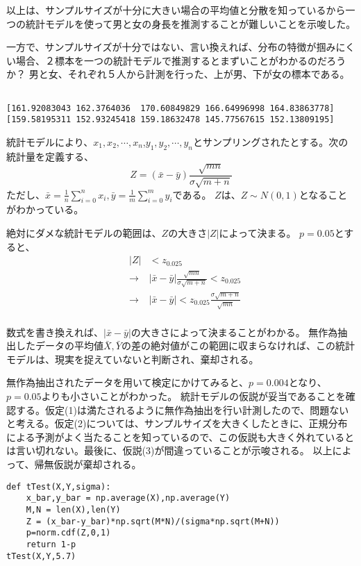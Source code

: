 \documentclass[a4paper,11pt,dvipdfmx]{jsarticle}
\begin{document}
以上は、サンプルサイズが十分に大きい場合の平均値と分散を知っているから一つの統計モデルを使って男と女の身長を推測することが難しいことを示唆した。


一方で、サンプルサイズが十分ではない、言い換えれば、分布の特徴が掴みにくい場合、２標本を一つの統計モデルで推測するとまずいことがわかるのだろうか？
男と女、それぞれ５人から計測を行った、上が男、下が女の標本である。
\begin{lstlisting}

[161.92083043 162.3764036  170.60849829 166.64996998 164.83863778]
[159.58195311 152.93245418 159.18632478 145.77567615 152.13809195]
\end{lstlisting}


統計モデルにより、$x_1,x_2,\cdots,x_n$,$y_1,y_2,\cdots,y_n$とサンプリングされたとする。次の統計量を定義する、
$$
Z=(\bar{x}-\bar{y})\frac{\sqrt{mn}}{\sigma\sqrt{m+n}}
$$
ただし、$\bar{x}=\frac{1}{n}\sum_{i=0}^{n} x_i,\bar{y}=\frac{1}{m}\sum_{i=0}^m y_i$である。
$Z$は、$Z\sim N(0,1)$となることがわかっている。

絶対にダメな統計モデルの範囲は、$Z$の大きさ$|Z|$によって決まる。
$p=0.05$とすると、
\begin{eqnarray*}
    &|Z|& < z_{0.025}\\
    &\rightarrow & |\bar{x}-\bar{y}|\frac{\sqrt{mn}}{\sigma\sqrt{m+n}} < z_{0.025}\\
    &\rightarrow& |\bar{x}-\bar{y}| <z_{0.025}\frac{ \sigma\sqrt{m+n} }{ \sqrt{mn }}\\
\end{eqnarray*}


数式を書き換えれば、$|\bar{x}-\bar{y}|$の大きさによって決まることがわかる。
無作為抽出したデータの平均値$\bar{X},\bar{Y}$の差の絶対値がこの範囲に収まらなければ、この統計モデルは、現実を捉えていないと判断され、棄却される。

無作為抽出されたデータを用いて検定にかけてみると、$p=0.004$となり、$p=0.05$よりも小さいことがわかった。
統計モデルの仮説が妥当であることを確認する。仮定(1)は満たされるように無作為抽出を行い計測したので、問題ないと考える。仮定(2)については、サンプルサイズを大きくしたときに、正規分布による予測がよく当たることを知っているので、この仮説も大きく外れているとは言い切れない。最後に、仮説(3)が間違っていることが示唆される。
以上によって、帰無仮説が棄却される。



\begin{lstlisting}
def tTest(X,Y,sigma):
    x_bar,y_bar = np.average(X),np.average(Y)
    M,N = len(X),len(Y)
    Z = (x_bar-y_bar)*np.sqrt(M*N)/(sigma*np.sqrt(M+N))
    p=norm.cdf(Z,0,1)
    return 1-p
tTest(X,Y,5.7)
\end{lstlisting}
\end{document}
